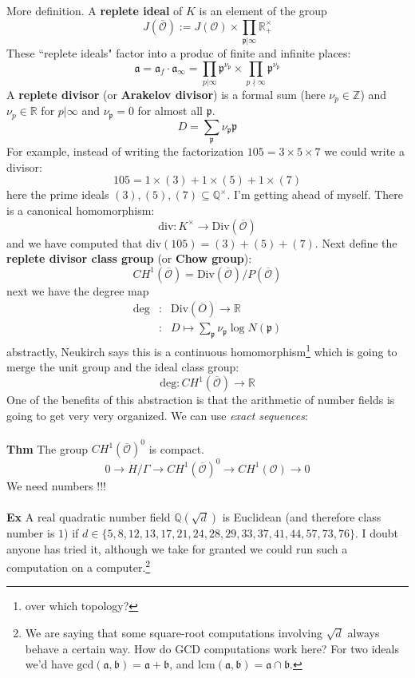 \documentclass[12pt]{article}
\begin{document}
\noindent More definition. A \textbf{replete ideal} of $K$ is an element of the group
$$ J(\overline{\mathcal{O}}) := J(\mathcal{O}) \times \prod_{\mathfrak{p}|\infty} \mathbb{R}^\times_+ $$
These ``replete ideals" factor into a produc of finite and infinite places:
$$ \mathfrak{a} = \mathfrak{a}_f \cdot \mathfrak{a}_\infty =  
\prod_{p | \infty} \mathfrak{p}^{\nu_{\mathfrak{p}}} \times \prod_{p \nmid \infty} \mathfrak{p}^{\nu_{\mathfrak{p}}} $$
A \textbf{replete divisor} (or \textbf{Arakelov divisor}) is a formal sum (here $\nu_p \in \mathbb{Z}$) and $\nu_p \in \mathbb{R}$ for $p | \infty$ and $\nu_\mathfrak{p} = 0$ for almost all $\mathfrak{p}$.
$$  D = \sum_{\mathfrak{p}} \nu_{\mathfrak{p}} \mathfrak{p}  $$
For example, instead of writing the factorization $105 = 3 \times 5 \times 7$ we could write a divisor:
$$ 105 = 1 \times (3) + 1 \times (5) + 1 \times (7) $$ 
here the prime ideals $(3), (5) , (7) \subseteq \mathbb{Q}^\times$.  I'm getting ahead of myself.  There is a canonical homomorphism:
$$ \text{div}: K^\times \to \text{Div}(\overline{\mathcal{O}})  $$
and we have computed that $\text{div}(105) = (3) + (5) + (7)$.  Next define the \textbf{replete divisor class group} (or \textbf{Chow group}):
$$ CH^1(\overline{\mathcal{O}}) = \text{Div}(\overline{\mathcal{O}})/P(\overline{\mathcal{O}})$$
next we have the degree map
\begin{eqnarray*}
\text{deg} &:& \text{Div}(\overline{O}) \to \mathbb{R} \\ 
 &:&D \mapsto \sum_\mathfrak{p} \nu_{\mathfrak{p}} \log N(\mathfrak{p}) 
\end{eqnarray*} 
abstractly, Neukirch says this is a continuous homomorphism\footnote{over which topology?} which is going to merge the unit group and the ideal class group:
$$ \text{deg}: CH^1(\overline{\mathcal{O}}) \to \mathbb{R} $$
One of the benefits of this abstraction is that the arithmetic of number fields is going to get very very organized.  We can use \textit{exact sequences}: \\ \\
\textbf{Thm} The group $CH^1(\overline{\mathcal{O}})^0$ is compact.
$$ 0 \to H/\Gamma \to CH^1(\overline{\mathcal{O}})^0 \to CH^1(\mathcal{O}) \to 0 $$
We need numbers !!! \\ \\
\textbf{Ex} A real quadratic number field $\mathbb{Q}(\sqrt{d})$ is Euclidean (and therefore class number is $1$) if $d \in \{5, 8, 12, 13, 17, 21, 24, 28, 29, 33, 37, 41, 44, 57, 73, 76  \}$.  I doubt anyone has tried it, although we take for granted we could run such a computation on a computer.\footnote{We are saying that some square-root computations involving $\sqrt{d}$ always behave a certain way.  How do GCD computations work here?  For two ideals we'd have $\text{gcd}(\mathfrak{a},\mathfrak{b}) = \mathfrak{a} + \mathfrak{b}$, and $\text{lcm}(\mathfrak{a},\mathfrak{b})=\mathfrak{a} \cap \mathfrak{b}$.} \\ 
\end{document}
